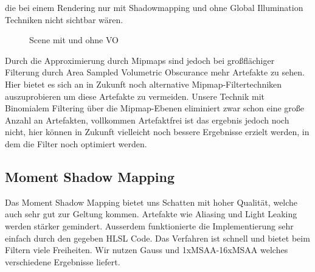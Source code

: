 \documentclass[runningheaders,a4paper]{llncs}
\begin{document}
die bei einem Rendering nur mit Shadowmapping und ohne Global Illumination Techniken nicht sichtbar wären.
\begin{figure}[H]
	\centering
	\quad\quad
	\centering
	\caption{Scene mit und ohne VO}
	\label{ref:finalVO}
\end{figure}
Durch die Approximierung durch Mipmaps sind jedoch bei
großflächiger Filterung durch Area Sampled Volumetric Obscurance mehr Artefakte zu sehen. Hier bietet es sich an in Zukunft noch alternative
Mipmap-Filtertechniken auszuprobieren um diese Artefakte zu vermeiden. Unsere Technik mit Binomialem
Filtering über die Mipmap-Ebenen eliminiert zwar schon eine große Anzahl an Artefakten, vollkommen
Artefaktfrei ist das ergebnis jedoch noch nicht, hier können in Zukunft vielleicht noch bessere Ergebnisse
erzielt werden, in dem die Filter noch optimiert werden.

\subsection{Moment Shadow Mapping}
Das Moment Shadow Mapping bietet uns Schatten mit hoher Qualität, welche auch sehr gut zur Geltung kommen. Artefakte wie Aliasing und Light Leaking werden stärker gemindert. Ausserdem funktionierte die Implementierung sehr einfach durch den gegeben HLSL Code. Das Verfahren ist schnell und bietet beim Filtern viele Freiheiten. Wir nutzen Gauss und 1xMSAA-16xMSAA welches verschiedene Ergebnisse liefert.
\end{document}
